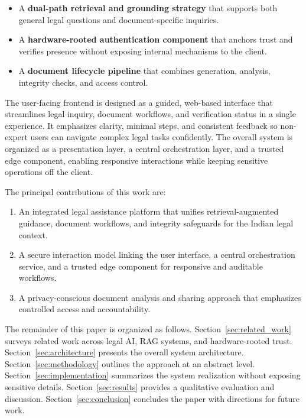 \begin{itemize}
    \item A \textbf{dual-path retrieval and grounding strategy} that supports both general legal questions and document-specific inquiries.
    \item A \textbf{hardware-rooted authentication component} that anchors trust and verifies presence without exposing internal mechanisms to the client.
    \item A \textbf{document lifecycle pipeline} that combines generation, analysis, integrity checks, and access control.
\end{itemize}

The user-facing frontend is designed as a guided, web-based interface that streamlines legal inquiry, document workflows, and verification status in a single experience. It emphasizes clarity, minimal steps, and consistent feedback so non-expert users can navigate complex legal tasks confidently. The overall system is organized as a presentation layer, a central orchestration layer, and a trusted edge component, enabling responsive interactions while keeping sensitive operations off the client.

The principal contributions of this work are:
\begin{enumerate}
    \item An integrated legal assistance platform that unifies retrieval-augmented guidance, document workflows, and integrity safeguards for the Indian legal context.
    \item A secure interaction model linking the user interface, a central orchestration service, and a trusted edge component for responsive and auditable workflows.
    \item A privacy-conscious document analysis and sharing approach that emphasizes controlled access and accountability.
\end{enumerate}

The remainder of this paper is organized as follows. Section~\ref{sec:related_work} surveys related work across legal AI, RAG systems, and hardware-rooted trust. Section~\ref{sec:architecture} presents the overall system architecture. Section~\ref{sec:methodology} outlines the approach at an abstract level. Section~\ref{sec:implementation} summarizes the system realization without exposing sensitive details. Section~\ref{sec:results} provides a qualitative evaluation and discussion. Section~\ref{sec:conclusion} concludes the paper with directions for future work.
